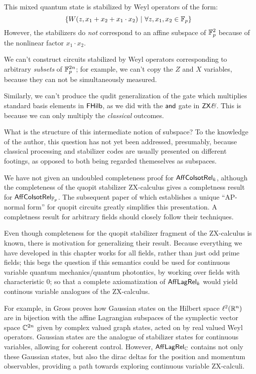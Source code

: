 This mixed quantum state is stabilized by Weyl operators of the form:
$$\{W(z,x_1+x_2+x_1\cdot x_2)\ |\ \forall z,x_1,x_2\in \mathbb{F}_p\}$$
However, the stabilizers do {\em not} correspond to an affine subspace of $\mathbb{F}_p^2$ because of the nonlinear factor $x_1\cdot x_2$.



We can't construct circuits stabilized by Weyl operators corresponding to arbitrary {\em subsets} of $\mathbb{F}_p^{2n}$; for example, we can't copy the $Z$ and $X$ variables, because they can not be simultaneously measured.


Similarly, we can't produce the qudit generalization of the gate which multiplies standard basis elements in $\mathsf{FHilb}$, as we did with the ${\sf and}$ gate in $\mathsf{ZX}\textit{\&}$.  This is because we can only multiply the {\em classical} outcomes.


What is the structure of this intermediate notion of subspace?
 To the knowledge of the author, this question has not yet been addressed, presumably, because classical processing and stabilizer codes are usually presented on different footings, as opposed to both being regarded themeselves as subspaces.

 

We have not given an undoubled completeness proof for $\mathsf{Aff}{\sf Co}{\sf Isot}\mathsf{Rel}_k$, although the completeness of the quopit stabilizer ZX-calculus \cite{booth} gives a completness result for $\mathsf{Aff}{\sf Co}{\sf Isot}\mathsf{Rel}_{\mathbb{F}_p}$. The subsequent paper of \cite{poor} which establishes a unique ``AP-normal form'' for quopit circuits greatly simplifies this presentation.  A completness result for arbitrary fields should closely follow their techniques.

Even though completeness for the quopit stabilizer fragment of the ZX-calculus is known, there is motivation for generalizing their result.
Because everything we have developed in this chapter works for all fields, rather than just odd prime fields; this begs the question if this semantics could be used for continuous variable quantum mechanics/quantum photontics, by working over fields with characteristic 0; so that a complete axiomatization of $\mathsf{Aff}\mathsf{Lag}\mathsf{Rel}_k$ would yield continous variable analogues of the ZX-calculus.

 For example, in \cite[Theorem 2]{gross} Gross proves how  Gaussian states on the Hilbert space $\ell^2(\mathbb{R}^n)$ are in bijection with the affine Lagrangian subspaces of the symplectic vector space $\mathbb{C}^{2n}$ given by complex valued graph states, acted on by real valued Weyl operators. 
Gaussian states are the analogue of stabilizer states for continuous variables, allowing for coherent control.
However,  $\mathsf{Aff}\mathsf{Lag}\mathsf{Rel}_{\mathbb{C}}$ contains not only these Gaussian states, but also the dirac deltas for the position and momentum observables, providing a path towards exploring continuous variable ZX-calculi.

